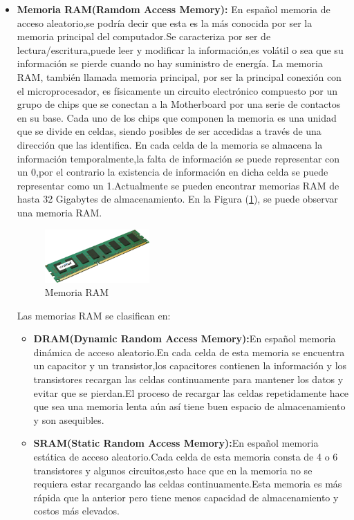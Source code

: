 \documentclass{article}
\begin{document}
\begin{itemize}
    \item \textbf{Memoria RAM(Ramdom Access Memory): }En español memoria de acceso aleatorio,se podría decir que esta es la más conocida por ser la memoria principal del computador.Se caracteriza por ser de lectura/escritura,puede leer y modificar la información,es volátil o sea que su información se pierde cuando no hay suministro de energía.\newline
    La memoria RAM, también llamada memoria principal, por ser la principal conexión con el microprocesador, es físicamente un circuito electrónico compuesto por un grupo de chips que se conectan a la Motherboard por una serie de contactos en su base. Cada uno de los chips que componen la memoria es una unidad que se divide en celdas, siendo posibles de ser accedidas a través de una dirección que las identifica\cite{ram}.\newline
    En cada celda de la memoria se almacena la información temporalmente,la falta de información se puede representar con un 0,por el contrario la existencia de información en dicha celda se puede representar como un 1.Actualmente se pueden encontrar memorias RAM de hasta 32 Gigabytes de almacenamiento.\newline
    En la Figura (\ref{fig:memoria}), se puede observar una memoria RAM.
     \begin{figure}[h]
    \includegraphics[width=4cm]{memoria.png}
    \centering
    \caption{Memoria RAM\cite{img1}}
    \label{fig:memoria}
    \end{figure}
    \newline
    Las memorias RAM se  clasifican en:
    \begin{itemize}
    \item\textbf{DRAM(Dynamic Random Access Memory):}En español memoria dinámica de acceso aleatorio.En cada celda de esta memoria se encuentra un capacitor y un transistor,los capacitores contienen la información y los transistores recargan las celdas continuamente para mantener los datos y evitar que se pierdan.El proceso de recargar las celdas repetidamente hace que sea una memoria lenta aún así tiene buen espacio de almacenamiento y son asequibles.
    \item\textbf{SRAM(Static Random Access Memory):}En español memoria estática de acceso aleatorio.Cada celda de esta memoria consta de 4 o 6 transistores y algunos circuitos,esto hace que en la memoria no se requiera estar recargando las celdas continuamente.Esta memoria es más rápida que la anterior pero  tiene menos capacidad de almacenamiento y costos más elevados\cite{ref1}. 
        

\end{itemize}
\end{itemize}
\end{document}
